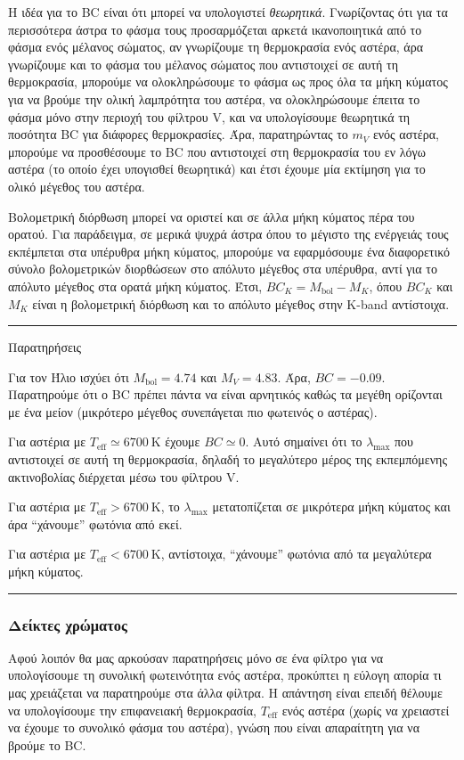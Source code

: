 Η ιδέα για το BC είναι ότι μπορεί να υπολογιστεί \textit{θεωρητικά}. Γνωρίζοντας ότι για τα περισσότερα άστρα το φάσμα τους προσαρμόζεται αρκετά ικανοποιητικά από το φάσμα ενός μέλανος σώματος, αν γνωρίζουμε τη θερμοκρασία ενός αστέρα, άρα γνωρίζουμε και το φάσμα του μέλανος σώματος που αντιστοιχεί σε αυτή τη θερμοκρασία, μπορούμε να ολοκληρώσουμε το φάσμα ως προς όλα τα μήκη κύματος για να βρούμε την ολική λαμπρότητα του αστέρα, να ολοκληρώσουμε έπειτα το φάσμα μόνο στην περιοχή του φίλτρου V, και να υπολογίσουμε θεωρητικά τη ποσότητα BC για διάφορες θερμοκρασίες.
Άρα, παρατηρώντας το $m_V$ ενός αστέρα, μπορούμε να προσθέσουμε το BC που αντιστοιχεί στη θερμοκρασία του εν λόγω αστέρα (το οποίο έχει υπογισθεί θεωρητικά) και έτσι έχουμε μία εκτίμηση για το ολικό μέγεθος του αστέρα.

Βολομετρική διόρθωση μπορεί να οριστεί και σε άλλα μήκη κύματος πέρα του ορατού. Για παράδειγμα, σε μερικά ψυχρά άστρα όπου το μέγιστο της ενέργειάς τους εκπέμπεται στα υπέρυθρα μήκη κύματος, μπορούμε να εφαρμόσουμε ένα διαφορετικό σύνολο βολομετρικών διορθώσεων στο απόλυτο μέγεθος στα υπέρυθρα, αντί για το απόλυτο μέγεθος στα ορατά μήκη κύματος. Έτσι, $BC_K = M_{\text{bol}} - M_K$, όπου $BC_K$ και $M_K$ είναι η βολομετρική διόρθωση και το απόλυτο μέγεθος στην K-band αντίστοιχα.  

\newpage
{\color{red} \hrule}
\begin{center}
	\large Παρατηρήσεις
\end{center}

Για τον Ήλιο ισχύει ότι $M_{\text{bol}} = 4.74$ και $M_V = 4.83$. Άρα, $BC = -0.09$.
Παρατηρούμε ότι ο BC πρέπει πάντα να είναι αρνητικός καθώς τα μεγέθη ορίζονται με ένα μείον (μικρότερο μέγεθος συνεπάγεται πιο φωτεινός ο αστέρας).

Για αστέρια με $T_{\text{eff}} \simeq 6700 \ \text{K}$ έχουμε $BC \simeq 0$. Αυτό σημαίνει ότι το $\lambda_{\text{max}}$ που αντιστοιχεί σε αυτή τη θερμοκρασία, δηλαδή το μεγαλύτερο μέρος της εκπεμπόμενης ακτινοβολίας διέρχεται μέσω του φίλτρου V.

Για αστέρια με $T_{\text{eff}} > 6700 \ \text{K}$, το $\lambda_{\text{max}}$ μετατοπίζεται σε μικρότερα μήκη κύματος και άρα ``χάνουμε'' φωτόνια από εκεί.

Για αστέρια με $T_{\text{eff}} < 6700 \ \text{K}$, αντίστοιχα, ``χάνουμε'' φωτόνια από τα μεγαλύτερα μήκη κύματος.\\
{\color{red} \hrule}



\subsubsection{Δείκτες χρώματος}
Αφού λοιπόν θα μας αρκούσαν παρατηρήσεις μόνο σε ένα φίλτρο για να υπολογίσουμε τη συνολική φωτεινότητα ενός αστέρα, προκύπτει η εύλογη απορία τι μας χρειάζεται να παρατηρούμε στα άλλα φίλτρα. Η απάντηση είναι επειδή θέλουμε να υπολογίσουμε την επιφανειακή θερμοκρασία, $T_{\text{eff}}$ ενός αστέρα (χωρίς να χρειαστεί να έχουμε το συνολικό φάσμα του αστέρα), γνώση που είναι απαραίτητη για να βρούμε το BC.

